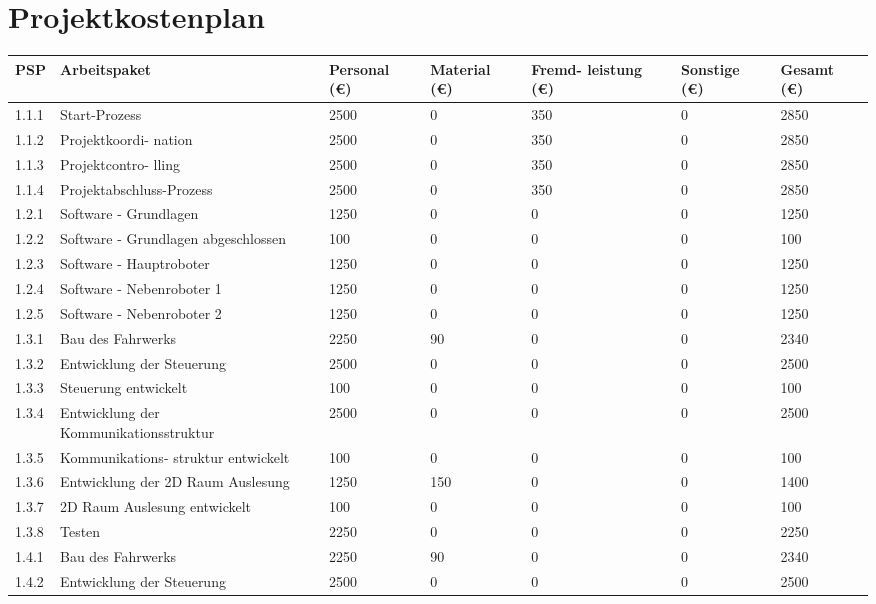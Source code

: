\section{Projektkostenplan}

\begin{longtable}[c]{|p{}|p{3cm}|p{}|p{}|p{2cm}|p{}|p{}|}
\hline
\textbf{PSP} & \textbf{Arbeitspaket} & \textbf{Personal (€)} & \textbf{Material (€)} & \textbf{Fremd-  leistung (€)} & \textbf{Sonstige (€)} & \textbf{Gesamt (€)} \\
\hline
1.1.1 & Start-Prozess & 2500 & 0 & 350 & 0 & 2850 \\
\hline
1.1.2 & Projektkoordi- nation & 2500 & 0 & 350 & 0 & 2850 \\
\hline
1.1.3 & Projektcontro- lling & 2500 & 0 & 350 & 0 & 2850 \\
\hline
1.1.4 & Projektabschluss-Prozess & 2500 & 0 & 350 & 0 & 2850 \\
\hline
1.2.1 & Software - Grundlagen & 1250 & 0 & 0 & 0 & 1250 \\
\hline
1.2.2 & Software - Grundlagen abgeschlossen & 100 & 0 & 0 & 0 & 100 \\
\hline
1.2.3 & Software - Hauptroboter & 1250 & 0 & 0 & 0 & 1250 \\
\hline
1.2.4 & Software - Nebenroboter 1 & 1250 & 0 & 0 & 0 & 1250 \\
\hline
1.2.5 & Software - Nebenroboter 2 & 1250 & 0 & 0 & 0 & 1250 \\
\hline
1.3.1 & Bau des Fahrwerks & 2250 & 90 & 0 & 0 & 2340 \\
\hline
1.3.2 & Entwicklung der Steuerung & 2500 & 0 & 0 & 0 & 2500 \\
\hline
1.3.3 & Steuerung entwickelt & 100 & 0 & 0 & 0 & 100 \\
\hline
1.3.4 & Entwicklung der Kommunikationsstruktur & 2500 & 0 & 0 & 0 & 2500 \\
\hline
1.3.5 & Kommunikations- struktur entwickelt & 100 & 0 & 0 & 0 & 100 \\
\hline
1.3.6 & Entwicklung der 2D Raum Auslesung & 1250 & 150 & 0 & 0 & 1400 \\
\hline
1.3.7 & 2D Raum Auslesung entwickelt & 100 & 0 & 0 & 0 & 100 \\
\hline
1.3.8 & Testen & 2250 & 0 & 0 & 0 & 2250 \\
\hline
1.4.1 & Bau des Fahrwerks & 2250 & 90 & 0 & 0 & 2340 \\
\hline
1.4.2 & Entwicklung der Steuerung & 2500 & 0 & 0 & 0 & 2500 \\

\end{longtable}
